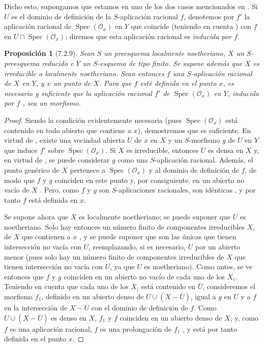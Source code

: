 \documentclass[oneside]{amsart}
\theoremstyle{ega-env-style}
\theoremstyle{ega-thm-env-style}
\newtheorem*{proposition}{Proposición}
\theoremstyle{ega-defn-env-style}
\def\setmin{-}                      %
\let\EGAOriginalLabel\label
\renewcommand{\label}[1]{\phantomsection\EGAOriginalLabel{#1}}
\begin{document}
Dicho esto, supongamos que estamos en uno de los dos casos mencionados en .
Si $U$ es el dominio de definición de la $S$-aplicación racional $f$, denotemos por $f'$ la aplicación racional de $\operatorname{Spec}(\mathscr{O}_x)$ en $Y$ que coincide (teniendo en cuenta ) con $f$ en $U\cap\operatorname{Spec}(\mathscr{O}_x)$; diremos que esta aplicación racional es \emph{inducida por $f$}.

\begin{proposition}[7.2.9]
\label{I.7.2.9}
Sean $S$ un preesquema localmente noetheriano, $X$ un $S$-preesquema reducido e $Y$ un $S$-esquema de tipo finito.
Se supone además que $X$ es irreducible o localmente noetheriano.
Sean entonces $f$ una $S$-aplicación racional de $X$ en $Y$, y $x$ un punto de $X$.
Para que $f$ esté definida en el punto $x$, es necesario y suficiente que la aplicación racional $f'$ de $\operatorname{Spec}(\mathscr{O}_x)$ en $Y$, inducida por $f$ , sea un morfismo.
\end{proposition}

\begin{proof}
Siendo la condición evidentemente necesaria (pues $\operatorname{Spec}(\mathscr{O}_x)$ está contenido en todo abierto que contiene a $x$), demostremos que es suficiente.
En virtud de , existe una vecindad abierta $U$ de $x$ en $X$ y un $S$-morfismo $g$ de $U$ en $Y$ que induce $f'$ sobre $\operatorname{Spec}(\mathscr{O}_x)$.
Si $X$ es irreducible, entonces $U$ es densa en $X$ y, en virtud de , se puede considerar $g$ como una $S$-aplicación racional.
Además, el punto genérico de $X$ pertenece a $\operatorname{Spec}(\mathscr{O}_x)$ y al dominio de definición de $f$, de modo que $f$ y $g$ coinciden en este punto y, por consiguiente, en un abierto no vacío de $X$ .
Pero, como $f$ y $g$ son $S$-aplicaciones racionales, son idénticas , y por tanto $f$ está definida en $x$.

Se supone ahora que $X$ es localmente noetheriano; se puede suponer que $U$ es noetheriano.
Solo hay entonces un número finito de componentes irreducibles $X_i$ de $X$ que contienen a $x$ , y se puede suponer que son las únicas que tienen intersección no vacía con $U$, reemplazando, si es necesario, $U$ por un abierto menor (pues solo hay un número finito de componentes irreducibles de $X$ que tienen intersección no vacía con $U$, ya que $U$ es noetheriano).
Como antes, se ve entonces que $f$ y $g$ coinciden en un abierto no vacío de cada uno de los $X_i$.
Teniendo en cuenta que cada uno de los $X_i$ está contenido en $\overline U$, consideremos el morfismo $f_1$, definido en un abierto denso de $U\cup(X\setmin\overline U)$, igual a $g$ en $U$ y a $f$ en la intersección de $X\setmin\overline U$ con el dominio de definición de $f$.
Como $U\cup(X\setmin\overline U)$ es denso en $X$, $f_1$ y $f$ coinciden en un abierto denso de $X$; y, como $f$ es una aplicación racional, $f$ es una prolongación de $f_1$ , y está por tanto definida en el punto $x$.
\end{proof}
\end{document}
